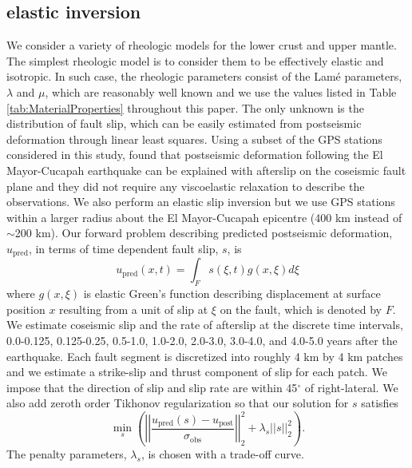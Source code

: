 \documentclass[review]{elsarticle}
\begin{document}
\subsection{elastic inversion}\label{sec:ElasticInversion}    
We consider a variety of rheologic models for the lower crust and upper mantle. The simplest rheologic model is to consider them to be effectively elastic and isotropic.  In such case, the rheologic parameters consist of the Lam\'e parameters, $\lambda$ and $\mu$, which are reasonably well known and we use the values listed in Table \ref{tab:MaterialProperties} throughout this paper.  The only unknown is the distribution of fault slip, which can be easily estimated from postseismic deformation through linear least squares.  Using a subset of the GPS stations considered in this study, \citet{Rollins2015} found that postseismic deformation following the El Mayor-Cucapah earthquake can be explained with afterslip on the coseismic fault plane and they did not require any viscoelastic relaxation to describe the observations. We also perform an elastic slip inversion but we use GPS stations within a larger radius about the El Mayor-Cucapah epicentre (400 km instead of $\sim$200 km). Our forward problem describing predicted postseismic deformation, $u_\mathrm{pred}$, in terms of time dependent fault slip, $s$, is
\begin{equation}\label{eq:ElasticForward}
  u_\mathrm{pred}(x,t) = \int_F s(\xi,t)g(x,\xi)d\xi 
\end{equation}           
where $g(x,\xi)$ is elastic Green's function describing displacement at surface position $x$ resulting from a unit of slip at $\xi$ on the fault, which is denoted by $F$.  We estimate coseismic slip and the rate of afterslip at the discrete time intervals, 0.0-0.125, 0.125-0.25, 0.5-1.0, 1.0-2.0, 2.0-3.0, 3.0-4.0, and 4.0-5.0 years after the earthquake.  Each fault segment is discretized into roughly 4 km by 4 km patches and we estimate a strike-slip and thrust component of slip for each patch. We impose that the direction of slip and slip rate are within 45$^\circ$ of right-lateral. We also add zeroth order Tikhonov regularization so that our solution for $s$ satisfies
\begin{equation}\label{eq:ElasticObjective}
  \min_s \left(\left|\left|\frac{u_\mathrm{pred}(s) - u_\mathrm{post}}                
                                {\sigma_\mathrm{obs}}\right|\right|_2^2 + 
                                \lambda_s||s||_2^2\right). 
\end{equation}
The penalty parameters, $\lambda_s$, is chosen with a trade-off curve. 
\end{document}

